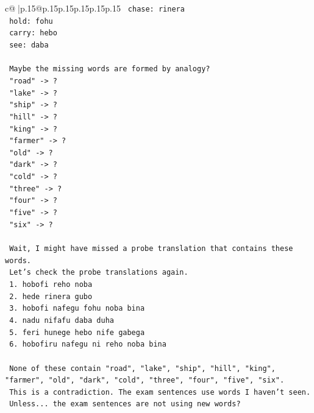 \documentclass{article}
\begin{document}
{\begin{supertabular}{c@{$\;$}|p{.15\linewidth}@{}p{.15\linewidth}p{.15\linewidth}p{.15\linewidth}p{.15\linewidth}p{.15\linewidth}}
{{{\texttt{        chase: rinera} \\
\texttt{        hold: fohu} \\
\texttt{        carry: hebo} \\
\texttt{        see: daba} \\
\\ 
\texttt{        Maybe the missing words are formed by analogy?} \\
\texttt{        "road" {-}> ?} \\
\texttt{        "lake" {-}> ?} \\
\texttt{        "ship" {-}> ?} \\
\texttt{        "hill" {-}> ?} \\
\texttt{        "king" {-}> ?} \\
\texttt{        "farmer" {-}> ?} \\
\texttt{        "old" {-}> ?} \\
\texttt{        "dark" {-}> ?} \\
\texttt{        "cold" {-}> ?} \\
\texttt{        "three" {-}> ?} \\
\texttt{        "four" {-}> ?} \\
\texttt{        "five" {-}> ?} \\
\texttt{        "six" {-}> ?} \\
\\ 
\texttt{        Wait, I might have missed a probe translation that contains these words.} \\
\texttt{        Let's check the probe translations again.} \\
\texttt{        1. hobofi reho noba} \\
\texttt{        2. hede rinera gubo} \\
\texttt{        3. hobofi nafegu fohu noba bina} \\
\texttt{        4. nadu nifafu daba duha} \\
\texttt{        5. feri hunege hebo nife gabega} \\
\texttt{        6. hobofiru nafegu ni reho noba bina} \\
\\ 
\texttt{        None of these contain "road", "lake", "ship", "hill", "king", "farmer", "old", "dark", "cold", "three", "four", "five", "six".} \\
\texttt{        This is a contradiction. The exam sentences use words I haven't seen.} \\
\texttt{        Unless... the exam sentences are not using new words?} \\
}}}
\end{supertabular}}
\end{document}
